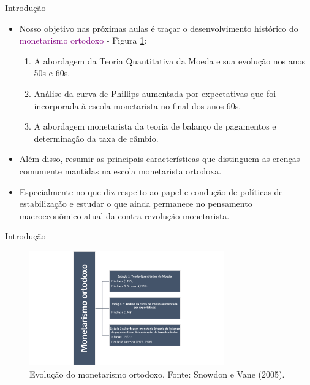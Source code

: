 \documentclass[10pt]{beamer}
\begin{document}
\begin{frame}{Introdução}
    \begin{itemize}
        \item Nosso objetivo nas próximas aulas é traçar o desenvolvimento histórico do \textcolor{purple}{monetarismo ortodoxo} - Figura \ref{fig1}:
        \bigskip
        \begin{enumerate}
            \item A abordagem da Teoria Quantitativa da Moeda e sua evolução nos anos 50s e 60s.
            \bigskip
            \item Análise da curva de Phillips aumentada por expectativas que foi incorporada à escola monetarista no final dos anos 60s.
            \bigskip
            \item A abordagem monetarista da teoria de balanço de pagamentos e determinação da taxa de câmbio.
        \end{enumerate}
        \item Além disso, resumir as principais características que distinguem as crenças comumente mantidas na escola monetarista ortodoxa.
        \bigskip
        \item Especialmente no que diz respeito ao papel e condução de políticas de estabilização e estudar o que ainda permanece no pensamento macroeconõmico atual da contra-revolução monetarista.
    \end{itemize}
\end{frame}

\begin{frame}{Introdução}
    \begin{figure}
        \centering
        \includegraphics[width=0.75\textwidth]{./figures/aula9_fig1.png}
        \caption{Evolução do monetarismo ortodoxo. Fonte: Snowdon e Vane (2005).}
        \label{fig1}
    \end{figure}
\end{frame}
\end{document}
